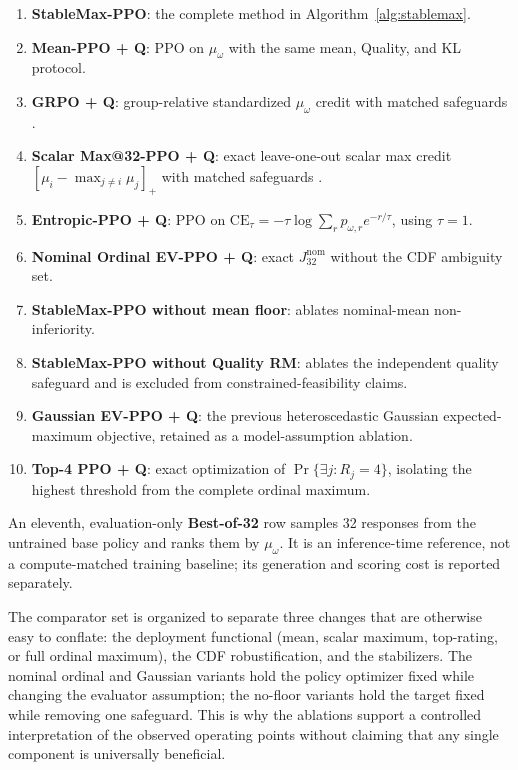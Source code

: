 \begin{enumerate}
\item \textbf{StableMax-PPO}: the complete method in
Algorithm~\ref{alg:stablemax}.
\item \textbf{Mean-PPO + Q}: PPO on
\(\mu_\omega\) with the same mean, Quality, and KL protocol.
\item \textbf{GRPO + Q}: group-relative standardized
\(\mu_\omega\) credit with matched safeguards
\citep{shao2024deepseekmath,guo2025deepseekr1}.
\item \textbf{Scalar Max@32-PPO + Q}: exact leave-one-out scalar
max credit
\( [\mu_i-\max_{j\ne i}\mu_j]_+ \)
with matched safeguards
\citep{tang2025inference,walder2025pkpo,bagirov2025best}.
\item \textbf{Entropic-PPO + Q}: PPO on
\(\mathrm{CE}_{\tau}=-\tau\log\sum_r p_{\omega,r}e^{-r/\tau}\),
using \(\tau=1\).
\item \textbf{Nominal Ordinal EV-PPO + Q}: exact
\(J_{32}^{\mathrm{nom}}\) without the CDF ambiguity set.
\item \textbf{StableMax-PPO without mean floor}: ablates nominal-mean
non-inferiority.
\item \textbf{StableMax-PPO without Quality RM}: ablates the independent
quality safeguard and is excluded from constrained-feasibility claims.
\item \textbf{Gaussian EV-PPO + Q}: the previous heteroscedastic
Gaussian expected-maximum objective, retained as a model-assumption ablation.
\item \textbf{Top-4 PPO + Q}: exact optimization of
\(\Pr\{\exists j:R_j=4\}\), isolating the highest
threshold from the complete ordinal maximum.
\end{enumerate}

An eleventh, evaluation-only \textbf{Best-of-32} row samples 32 responses
from the untrained base policy and ranks them by
\(\mu_\omega\).  It is an inference-time reference, not a
compute-matched training baseline; its generation and scoring cost is reported
separately.

The comparator set is organized to separate three changes that are otherwise
easy to conflate: the deployment functional (mean, scalar maximum, top-rating,
or full ordinal maximum), the CDF robustification, and the stabilizers.
The nominal ordinal and Gaussian variants hold the policy optimizer fixed while
changing the evaluator assumption; the no-floor variants hold the target fixed
while removing one safeguard.  This is why the ablations support a controlled interpretation of the observed
operating points without claiming that any single component is universally
beneficial.


